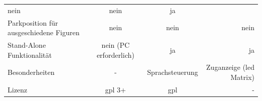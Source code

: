 \begin{longtable}[]{@{}lccr@{}}
\begin{minipage}[t]{0.25\columnwidth}
nein\strut
\end{minipage} & \begin{minipage}[t]{0.26\columnwidth}\centering
nein\strut
\end{minipage} & \begin{minipage}[t]{0.19\columnwidth}\raggedleft
ja\strut
\end{minipage}\tabularnewline
\begin{minipage}[t]{0.19\columnwidth}\raggedright
Parkposition für ausgeschiedene Figuren\strut
\end{minipage} & \begin{minipage}[t]{0.25\columnwidth}\centering
nein\strut
\end{minipage} & \begin{minipage}[t]{0.26\columnwidth}\centering
nein\strut
\end{minipage} & \begin{minipage}[t]{0.19\columnwidth}\raggedleft
nein\strut
\end{minipage}\tabularnewline
\begin{minipage}[t]{0.19\columnwidth}\raggedright
Stand-Alone Funktionalität\strut
\end{minipage} & \begin{minipage}[t]{0.25\columnwidth}\centering
nein (PC erforderlich)\strut
\end{minipage} & \begin{minipage}[t]{0.26\columnwidth}\centering
ja\strut
\end{minipage} & \begin{minipage}[t]{0.19\columnwidth}\raggedleft
ja\strut
\end{minipage}\tabularnewline
\begin{minipage}[t]{0.19\columnwidth}\raggedright
Besonderheiten\strut
\end{minipage} & \begin{minipage}[t]{0.25\columnwidth}\centering
-\strut
\end{minipage} & \begin{minipage}[t]{0.26\columnwidth}\centering
Sprachsteuerung\strut
\end{minipage} & \begin{minipage}[t]{0.19\columnwidth}\raggedleft
Zuganzeige (\gls{led} Matrix)\strut
\end{minipage}\tabularnewline
\begin{minipage}[t]{0.19\columnwidth}\raggedright
Lizenz\strut
\end{minipage} & \begin{minipage}[t]{0.25\columnwidth}\centering
\gls{gpl} 3+\strut
\end{minipage} & \begin{minipage}[t]{0.26\columnwidth}\centering
\gls{gpl}\strut
\end{minipage} & \begin{minipage}[t]{0.19\columnwidth}\raggedleft
-\strut
\end{minipage}\tabularnewline
\bottomrule
\end{longtable}

